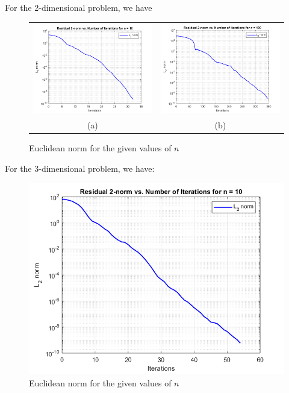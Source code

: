\documentclass[a4paper,11pt]{article}
\begin{document}
\clearpage
For the 2-dimensional problem, we have
\begin{figure}[!ht]
	\centering
	\begin{tabular}{cc}
		\includegraphics[width=.55\textwidth]{CG2_1e1_norm} &\hspace{-25pt} \includegraphics[width=.55\textwidth]{CG2_1e2_norm} \\
		(a) & (b)\\
	\end{tabular}
	\caption{Euclidean norm for the given values of $n$}
	\label{}
\end{figure}

For the 3-dimensional problem, we have:
\begin{figure}[!ht]
	\centering
		\includegraphics[width=.55\textwidth]{CG3_1e1_norm} \hspace{-25pt}
	\caption{Euclidean norm for the given values of $n$}
	\label{}
\end{figure}
\end{document}
